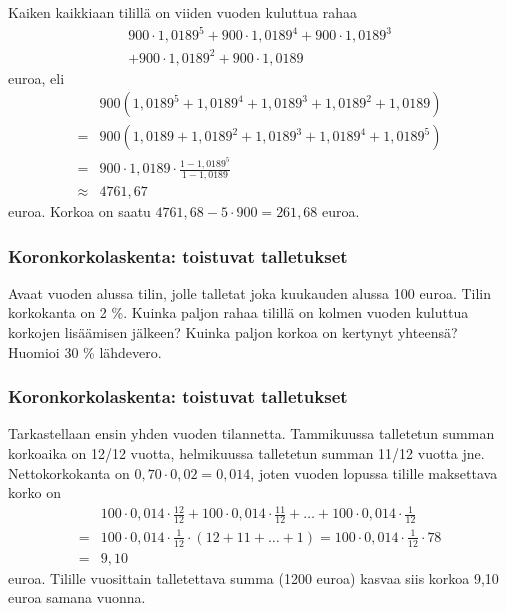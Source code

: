 \documentclass[]{beamer}
\begin{document}
\begin{frame}
    \begin{ratkaisu}
        Kaiken kaikkiaan tilillä on viiden vuoden kuluttua rahaa
        \begin{multline*}
            900\cdot1,0189^5 + 900\cdot1,0189^4 + 900\cdot1,0189^3\\
             +900\cdot1,0189^2 + 900\cdot1,0189
        \end{multline*}
        euroa, eli\pause
        \begin{align*}
            &900(1,0189^5 + 1,0189^4 + 1,0189^3 + 1,0189^2 + 1,0189)\\
            =&900(1,0189 + 1,0189^2 + 1,0189^3 + 1,0189^4 + 1,0189^5)\\
            =&900\cdot1,0189\cdot\frac{1-1,0189^5}{1-1,0189}\\
            \approx & 4761,67
        \end{align*}
        euroa. \pause Korkoa on saatu \(4761,68-5\cdot900 = 261,68\) euroa.
    \end{ratkaisu}
\end{frame}

\begin{frame}
    \frametitle{Koronkorkolaskenta: toistuvat talletukset}
    \pause
    \begin{esim}
        Avaat vuoden alussa tilin, jolle talletat joka kuukauden alussa 100 euroa.
        Tilin korkokanta on 2 \%. Kuinka paljon rahaa tilillä on kolmen vuoden kuluttua korkojen lisäämisen jälkeen?
        Kuinka paljon korkoa on kertynyt yhteensä? Huomioi 30 \% lähdevero.
    \end{esim}
\end{frame}

\begin{frame}
    \frametitle{Koronkorkolaskenta: toistuvat talletukset}
    \pause
    \begin{ratkaisu}
      \pause
        Tarkastellaan ensin yhden vuoden tilannetta. 
        \pause
        Tammikuussa talletetun summan korkoaika on 12/12 vuotta, helmikuussa
        talletetun summan 11/12 vuotta jne. 
        \pause Nettokorkokanta on \(0,70\cdot 0,02 = 0,014\),
        joten vuoden lopussa tilille maksettava korko on 
        \pause
        \begin{align*}
             &100\cdot0,014\cdot\frac{12}{12} + 100\cdot0,014\cdot\frac{11}{12} + \ldots + 100\cdot0,014\cdot\frac{1}{12}\\
            =&100\cdot0,014\cdot\frac{1}{12}\cdot(12+11+\ldots+1) = 100\cdot0,014\cdot\frac{1}{12}\cdot78\\
            =&9,10
        \end{align*}
        euroa. 
        \pause Tilille vuosittain talletettava summa (1200 euroa) kasvaa siis korkoa 9,10 euroa samana vuonna.
    \end{ratkaisu}
\end{frame}
\end{document}
